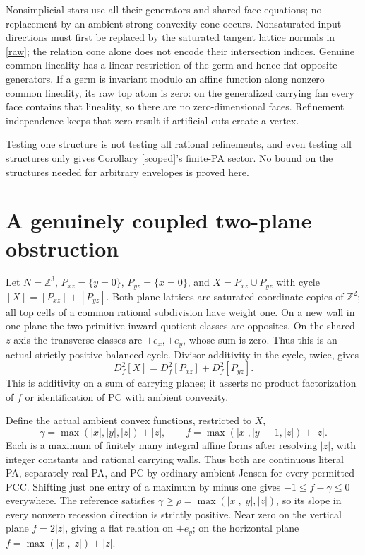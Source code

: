 \documentclass[11pt]{article}
\newcommand{\Z}{\mathbb Z}
\begin{document}
Nonsimplicial stars use all their generators and shared-face equations;
no replacement by an ambient strong-convexity cone occurs.
Nonsaturated input directions must first be replaced by the saturated
tangent lattice normals in \eqref{raw}; the relation cone alone does
not encode their intersection indices. Genuine common lineality has
a linear restriction of the germ and hence flat opposite generators.
If a germ is invariant modulo an affine function along nonzero common
lineality, its raw top atom is zero: on the generalized carrying fan
every face contains that lineality, so there are no zero-dimensional
faces. Refinement independence keeps that zero result if artificial
cuts create a vertex.

Testing one structure is not testing all rational refinements, and even
testing all structures only gives Corollary \ref{scoped}'s finite-PA
sector. No bound on the structures needed for arbitrary envelopes is
proved here.

\section{A genuinely coupled two-plane obstruction}\label{coupled-section}
Let $N=\Z^3$, $P_{xz}=\{y=0\}$, $P_{yz}=\{x=0\}$, and
$X=P_{xz}\cup P_{yz}$ with cycle $[X]=[P_{xz}]+[P_{yz}]$.
Both plane lattices are saturated coordinate copies of $\Z^2$; all top
cells of a common rational subdivision have weight one. On a new wall
in one plane the two primitive inward quotient classes are opposites.
On the shared $z$-axis the transverse classes are $\pm e_x,\pm e_y$,
whose sum is zero. Thus this is an actual strictly positive balanced
cycle. Divisor additivity in the cycle, twice, gives
\[
 D_f^2[X]=D_f^2[P_{xz}]+D_f^2[P_{yz}].
\]
This is additivity on a sum of carrying planes; it asserts no product
factorization of $f$ or identification of PC with ambient convexity.

Define the actual ambient convex functions, restricted to $X$,
\[
 \gamma=\max(|x|,|y|,|z|)+|z|,\qquad
 f=\max(|x|,|y|-1,|z|)+|z|.
\]
Each is a maximum of finitely many integral affine forms after resolving
$|z|$, with integer constants and rational carrying walls. Thus both
are continuous literal PA, separately real PA, and PC by ordinary
ambient Jensen for every permitted PCC. Shifting just one entry of a
maximum by minus one gives $-1\leq f-\gamma\leq0$ everywhere.
The reference satisfies $\gamma\geq\rho=\max(|x|,|y|,|z|)$, so its
slope in every nonzero recession direction is strictly positive.
Near zero on the vertical plane $f=2|z|$, giving a flat relation on
$\pm e_y$; on the horizontal plane $f=\max(|x|,|z|)+|z|$.
\end{document}

